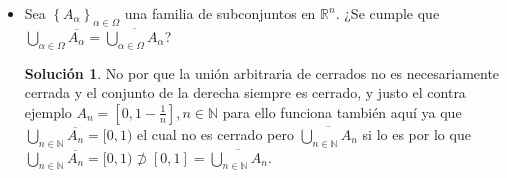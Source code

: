 \documentclass[letterpaper]{article}
\theoremstyle{definition}
\theoremstyle{lemathm}
\theoremstyle{lemathm}
\newtheorem{sol}{Solución}
\theoremstyle{lemathm}
\theoremstyle{lemademthm}
\newcommand{\txty}{\text{ y }}
\newcommand{\pars}[1]{\left( #1 \right) }
\newcommand{\bracs}[1]{\left[ #1 \right] }
\newcommand{\norm}[1]{\left\lVert#1\right\rVert}
\newcommand{\set}[1]{\left \{ #1 \right\} }
\newcommand{\NN}{\mathbb{N}}
\newcommand{\RR}{\mathbb{R}}
\newcommand{\1}{\mathbbm{1}}
\begin{document}
\begin{enumerate}
\begin{itemize}
\begin{proof}
				Si $y = \pars{\vec{a'},\vec{b'}} \in B\pars{\vec{a},\frac{\epsilon}{\sqrt{2}}}\times B\pars{\vec{b},\frac{\epsilon}{\sqrt{2}}}$ entonces 

				entonces 
				
				\[\norm{\vec{a}' - \vec{a}} < \frac{\epsilon}{\sqrt{2}} \txty \norm{\vec{b}' - \vec{b}} < \frac{\epsilon}{\sqrt{2}},\]
				
				por lo que
				
				\[\norm{\vec{y}-\vec{x}}^2 = \norm{\vec{a}' - \vec{a}}^2  + \norm{\vec{b}' - \vec{b}}^2 < \epsilon\]
				
				es decir $y\in B\pars{\vec{x},\epsilon}$.

				Pero por definición tenemos que

				\[B\pars{\vec{a},\frac{\epsilon}{\sqrt{2}}} \cap A \neq \emptyset,\]

				y

				\[B\pars{\vec{a},\frac{\epsilon}{\sqrt{2}}} \cap A \neq \emptyset,\]

				por lo que si 
				
				\[\vec{a'} \in B\pars{\vec{a},\frac{\epsilon}{\sqrt{2}}} \cap A \txty \vec{b'} \in B\pars{\vec{a},\frac{\epsilon}{\sqrt{2}}} \cap A,\]
				
				entonces
				
				\[\vec{y} = \pars{\vec{a'},\vec{b'}} \in B\pars{\vec{x}, \epsilon} \txty \vec{y} \in A\times B,\]
				
				por lo que 
				
				\[B\pars{\vec{x}, \epsilon} \cap A\times B \neq \emptyset,\]
				
				por lo tanto

				\[\overline{A\times B} \supset \overline{A} \times \overline{B},\]

				concluimos que

				\[\overline{A\times B} = \overline{A} \times \overline{B}.\]

			\end{proof}

			\item Sea $\set{A_\alpha}_{\alpha\in\Omega}$ una familia de subconjuntos en $\RR^n$. ¿Se cumple que $\bigcup_{\alpha\in\Omega}\overline{A_\alpha} = \overline{\bigcup_{\alpha\in\Omega}A_{\alpha}}$?
			
			\begin{sol}

				No por que la unión arbitraria de cerrados no es necesariamente cerrada y el conjunto de la derecha siempre es cerrado, y justo el contra ejemplo $A_n = \bracs{0,1-\frac{1}{n}}, n\in\NN$ para ello funciona también aquí ya que $\bigcup_{n\in\NN} \overline{A_n} = [0,1)$ el cual no es cerrado pero $\overline{\bigcup_{n\in\NN}A_{n}}$ si lo es por lo que $\bigcup_{n\in\NN}\overline{A_n} = [0,1) \not\supset [0,1] = \overline{\bigcup_{n\in\NN}A_{n}}$.
				

\end{sol}
\end{itemize}
\end{enumerate}
\end{document}
